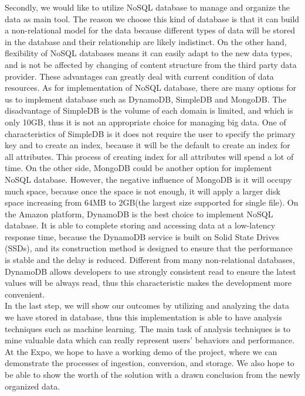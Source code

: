 \documentclass[letterpaper,10pt]{article}
\begin{document}
    \noindent Secondly, we would like to utilize NoSQL database to manage and organize the data as main tool. The reason we choose this kind of database is that it can build a non-relational model for the data because different types of data will be stored in the database and their relationship are likely indistinct. On the other hand, flexibility of NoSQL databases means it can easily adapt to the new data types, and is not be affected by changing of content structure from the third party data provider. These advantages can greatly deal with current condition of data resources. 
    As for implementation of NoSQL database, there are many options for us to implement database such as DynamoDB, SimpleDB and MongoDB. The disadvantage of SimpleDB is the volume of each domain is limited, and which is only 10GB, thus it is not an appropriate choice for managing big data. One of characteristics of SimpleDB is it does not require the user to specify the primary key and to create an index, because it will be the default to create an index for all attributes. This process of creating index for all attributes will spend a lot of time. On the other side, MongoDB could be another option for implement NoSQL database. However, the negative influence of MongoDB is it will occupy much space, because once the space is not enough, it will apply a larger disk space increasing from 64MB to 2GB(the largest size supported for single file). On the Amazon platform, DynamoDB is the best choice to implement NoSQL database. It is able to complete storing and accessing data at a low-latency response time, because the DynamoDB service is built on Solid State Drives (SSDs), and its construction method is designed to ensure that the performance is stable and the delay is reduced. Different from many non-relational databases, DynamoDB allows developers to use strongly consistent read to ensure the latest values will be always read, thus this characteristic makes the development more convenient.\\

    \noindent In the last step, we will show our outcomes by utilizing and analyzing the data we have stored in database, thus this implementation is able to have analysis techniques such as machine learning. The main task of analysis techniques is to mine valuable data which can really represent users’ behaviors and performance.  At the Expo, we hope to have a working demo of the project, where we can demonstrate the processes of ingestion, conversion, and storage. We also hope to be able to show the worth of the solution with a drawn conclusion from the newly organized data.
\end{document}
